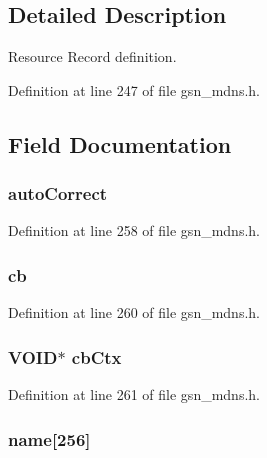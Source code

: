 \subsection{Detailed Description}
Resource Record definition. 

Definition at line 247 of file gsn\_\-mdns.h.



\subsection{Field Documentation}
\hypertarget{a00457_a6922e2bbd8ef32a53abd5bbf5e2b40a1}{
\subsubsection[{autoCorrect}]{ {\bf autoCorrect}}}
\label{a00457_a6922e2bbd8ef32a53abd5bbf5e2b40a1}


Definition at line 258 of file gsn\_\-mdns.h.

\hypertarget{a00457_a9537e3f5198ad7dff4aeecabdc552166}{
\subsubsection[{cb}]{ {\bf cb}}}
\label{a00457_a9537e3f5198ad7dff4aeecabdc552166}


Definition at line 260 of file gsn\_\-mdns.h.

\hypertarget{a00457_abc1717c5357c7dda5c2abef096a06f1f}{
\subsubsection[{cbCtx}]{\setlength{\rightskip}{0pt plus 5cm}VOID$\ast$ {\bf cbCtx}}}
\label{a00457_abc1717c5357c7dda5c2abef096a06f1f}


Definition at line 261 of file gsn\_\-mdns.h.

\hypertarget{a00457_a3f1ddd1a1bd4e4f28e75041bfe9a480c}{
\subsubsection[{name}]{ {\bf name}\mbox{[}256\mbox{]}}}
\label{a00457_a3f1ddd1a1bd4e4f28e75041bfe9a480c}


